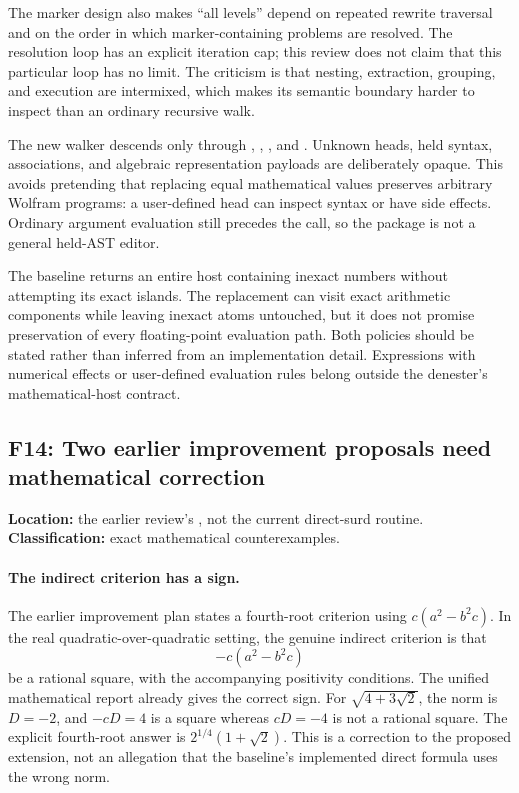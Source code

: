 \documentclass[11pt,letterpaper]{article}
\newcommand{\code}[1]{\texttt{\detokenize{#1}}}
\theoremstyle{definition}
\theoremstyle{remark}
\newcommand{\finding}[2]{\subsection{#1: #2}\label{f:#1}}
\begin{document}
The marker design also makes ``all levels'' depend on repeated rewrite traversal and on the order in which marker-containing problems are resolved. The resolution loop has an explicit iteration cap; this review does not claim that this particular loop has no limit. The criticism is that nesting, extraction, grouping, and execution are intermixed, which makes its semantic boundary harder to inspect than an ordinary recursive walk.

The new walker descends only through \code{Plus}, \code{Times}, \code{Power}, and \code{List}. Unknown heads, held syntax, associations, and algebraic representation payloads are deliberately opaque. This avoids pretending that replacing equal mathematical values preserves arbitrary Wolfram programs: a user-defined head can inspect syntax or have side effects. Ordinary argument evaluation still precedes the call, so the package is not a general held-AST editor.

The baseline returns an entire host containing inexact numbers without attempting its exact islands. The replacement can visit exact arithmetic components while leaving inexact atoms untouched, but it does not promise preservation of every floating-point evaluation path. Both policies should be stated rather than inferred from an implementation detail. Expressions with numerical effects or user-defined evaluation rules belong outside the denester's mathematical-host contract.

\finding{F14}{Two earlier improvement proposals need mathematical correction}

\textbf{Location:} the earlier review's \code{sec_future.tex}, not the current direct-surd routine.
\textbf{Classification:} exact mathematical counterexamples.

\paragraph{The indirect criterion has a sign.}
The earlier improvement plan states a fourth-root criterion using $c(a^2-b^2c)$. In the real quadratic-over-quadratic setting, the genuine indirect criterion is that
\[
 -c(a^2-b^2c)
\]
be a rational square, with the accompanying positivity conditions. The unified mathematical report already gives the correct sign. For $\sqrt{4+3\sqrt2}$, the norm is $D=-2$, and $-cD=4$ is a square whereas $cD=-4$ is not a rational square. The explicit fourth-root answer is $2^{1/4}(1+\sqrt2)$. This is a correction to the proposed extension, not an allegation that the baseline's implemented direct formula uses the wrong norm.\cite{priorfuture,report,gkioulekas}
\end{document}
